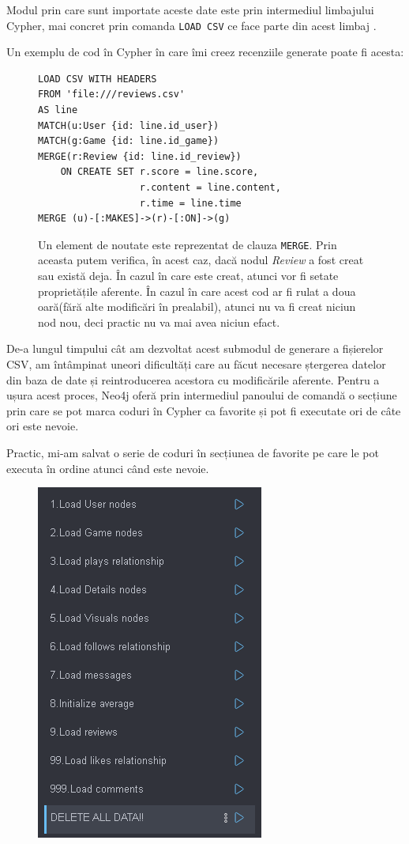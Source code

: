 \documentclass[12pt,a4paper]{report}
\begin{document}
Modul prin care sunt importate aceste date este prin intermediul limbajului Cypher, mai concret prin comanda \texttt{LOAD CSV} ce face parte din acest limbaj \cite{18}.

Un exemplu de cod în Cypher în care îmi creez recenziile generate poate fi acesta:

\begin{figure}[H]
\centering
\begin{BVerbatim}
LOAD CSV WITH HEADERS
FROM 'file:///reviews.csv'
AS line
MATCH(u:User {id: line.id_user})
MATCH(g:Game {id: line.id_game})
MERGE(r:Review {id: line.id_review})
    ON CREATE SET r.score = line.score,
                  r.content = line.content,
                  r.time = line.time
MERGE (u)-[:MAKES]->(r)-[:ON]->(g)
\end{BVerbatim}
\caption*{Un element de noutate este reprezentat de clauza \texttt{MERGE}. Prin aceasta putem verifica, în acest caz, dacă nodul \emph{Review} a fost creat sau există deja. În cazul în care este creat, atunci vor fi setate proprietățile aferente. În cazul în care acest cod ar fi rulat a doua oară(fără alte modificări în prealabil), atunci nu va fi creat niciun nod nou, deci practic nu va mai avea niciun efact.}
\end{figure}

De-a lungul timpului cât am dezvoltat acest submodul de generare a fișierelor CSV, am întâmpinat uneori dificultăți care au făcut necesare ștergerea datelor din baza de date și reintroducerea acestora cu modificările aferente. Pentru a ușura acest proces, Neo4j oferă prin intermediul panoului de comandă o secțiune prin care se pot marca coduri în Cypher ca favorite și pot fi executate ori de câte ori este nevoie.

Practic, mi-am salvat o serie de coduri în secțiunea de favorite pe care le pot executa în ordine atunci când este nevoie. 

\begin{figure}[H]
\centering
\caption{}
\includegraphics[scale = 0.8]{exemplu_15_favorites}
\caption*{}
\end{figure}
\end{document}
